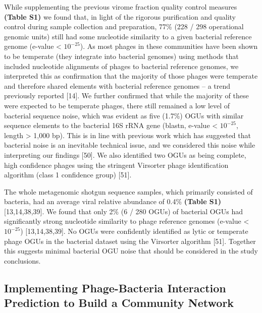 \documentclass[12pt,]{article}
\begin{document}
While supplementing the previous virome fraction quality control
measures \textbf{(Table S1)} we found that, in light of the rigorous
purification and quality control during sample collection and
preparation, 77\% (228 / 298 operational genomic units) still had some
nucleotide similarity to a given bacterial reference genome (e-value
\textless{} \(10^{-25}\)). As most phages in these communities have been
shown to be temperate (they integrate into bacterial genomes) using
methods that included nucleotide alignments of phages to bacterial
reference genomes, we interpreted this as confirmation that the majority
of those phages were temperate and therefore shared elements with
bacterial reference genomes -- a trend previously reported {[}14{]}. We
further confirmed that while the majority of these were expected to be
temperate phages, there still remained a low level of bacterial sequence
noise, which was evident as five (1.7\%) OGUs with similar sequence
elements to the bacterial 16S rRNA gene (blastn, e-value \textless{}
\(10^{-25}\), length \textgreater{} 1,000 bp). This is in line with
previous work which has suggested that bacterial noise is an inevitable
technical issue, and we considered this noise while interpreting our
findings {[}50{]}. We also identified two OGUs as being complete, high
confidence phages using the stringent Virsorter phage identification
algorithm (class 1 confidence group) {[}51{]}.

The whole metagenomic shotgun sequence samples, which primarily
consisted of bacteria, had an average viral relative abundance of 0.4\%
\textbf{(Table S1)} {[}13,14,38,39{]}. We found that only 2\% (6 / 280
OGUs) of bacterial OGUs had significantly strong nucleotide similarity
to phage reference genomes (e-value \textless{} \(10^{-25}\))
{[}13,14,38,39{]}. No OGUs were confidently identified as lytic or
temperate phage OGUs in the bacterial dataset using the Virsorter
algorithm {[}51{]}. Together this suggests minimal bacterial OGU noise
that should be considered in the study conclusions.

\subsection{Implementing Phage-Bacteria Interaction Prediction to Build
a Community
Network}\label{implementing-phage-bacteria-interaction-prediction-to-build-a-community-network}
\end{document}
